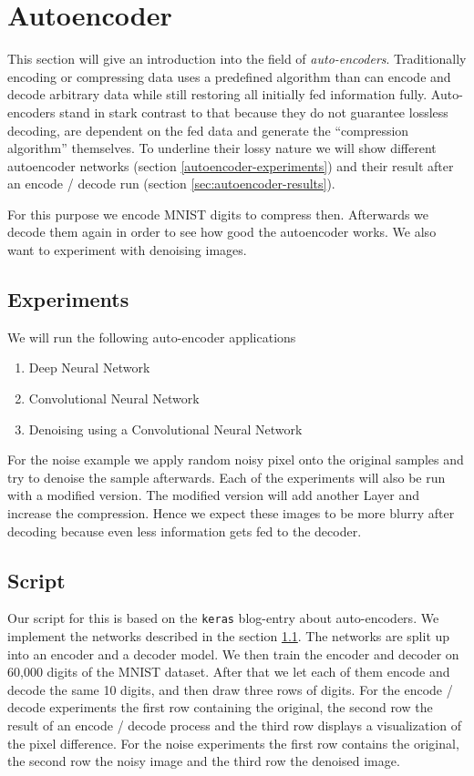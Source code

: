 \documentclass{article}[]
\begin{document}
\section{Autoencoder}
\label{sec:autoencoder}
This section will give an introduction into the field of \emph{auto-encoders}.
Traditionally encoding or compressing data uses a predefined algorithm than can encode and decode arbitrary data while still restoring all initially fed information fully.
Auto-encoders stand in stark contrast to that because they do not guarantee lossless decoding, are dependent on the fed data and generate the \enquote{compression algorithm} themselves\cite{kerasautoencoders}.
To underline their lossy nature we will show different autoencoder networks (section \ref{autoencoder-experiments}) and their result after an encode / decode run (section \ref{sec:autoencoder-results}).


For this purpose we encode MNIST digits to compress then.
Afterwards we decode them again in order to see how good the autoencoder works.
We also want to experiment with denoising images.

\subsection{Experiments}
\label{sec:autoencoder-experiments}
We will run the following auto-encoder applications
\begin{enumerate}
	\item{Deep Neural Network}
	\item{Convolutional Neural Network}
	\item{Denoising using a Convolutional Neural Network}
\end{enumerate}
For the noise example we apply random noisy pixel onto the original samples and try to denoise the sample afterwards.
Each of the experiments will also be run with a modified version. The modified version will add another Layer and increase the compression. Hence we expect these images to be more blurry after decoding because even less information gets fed to the decoder.

\subsection{Script}
\label{sec:autoencoder-script}
Our script for this is based on the \texttt{keras}\cite{keras} blog-entry about auto-encoders\cite{kerasautoencoders}.
We implement the networks described in the  section \ref{sec:autoencoder-experiments}.
The networks are split up into an encoder and a decoder model. 
We then train the encoder and decoder on 60,000 digits of the MNIST\cite{mnist} dataset.
After that we let each of them encode and decode the same 10 digits, and then draw three rows of digits.
For the encode / decode experiments the first row containing the original, the second row the result of an encode / decode process and the third row displays a visualization of the pixel difference.
For the noise experiments the first row contains the original, the second row the noisy image and the third row the denoised image.
\end{document}
